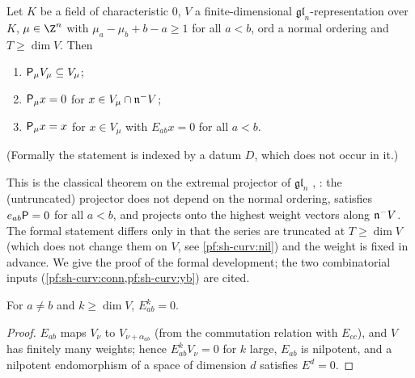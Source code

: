 \begin{theorem}\label{pf:sh-curv:E}
Let $K$ be a field of characteristic $0$, $V$ a finite-dimensional $\mathfrak{gl}_n$-representation over $K$, $\mu\in\Z^n$
with $\mu_a-\mu_b+b-a\ge1$ for all $a<b$, $\mathrm{ord}$ a normal ordering and $T\ge\dim V$. Then
\begin{enumerate}[label=(\roman*)]
\item $\mathsf P_\mu V_\mu\subseteq V_\mu$;
\item $\mathsf P_\mu x=0$ for $x\in V_\mu\cap\mathfrak n^- V$;
\item $\mathsf P_\mu x=x$ for $x\in V_\mu$ with $E_{ab}x=0$ for all $a<b$.
\end{enumerate}
(Formally the statement is indexed by a datum $D$, which does not occur in it.)
\end{theorem}

This is the classical theorem on the extremal projector of $\mathfrak{gl}_n$
\cite{AsherovaSmirnovTolstoy1971}, \cite[Thms.~2 and 4]{Zhelobenko1989}: the (untruncated) projector does not depend on the
normal ordering, satisfies $e_{ab}\mathsf P=0$ for all $a<b$, and projects onto the highest weight vectors along
$\mathfrak n^- V$. The formal statement differs only in that the series are truncated at $T\ge\dim V$ (which does not change
them on $V$, see \cref{pf:sh-curv:nil}) and the weight is fixed in advance. We give the proof of the formal development; the
two combinatorial inputs (\cref{pf:sh-curv:conn,pf:sh-curv:yb}) are cited.

\begin{lemma}[Nilpotency]\label{pf:sh-curv:nil}
For $a\ne b$ and $k\ge\dim V$, $E_{ab}^k=0$.
\end{lemma}

\begin{proof}
$E_{ab}$ maps $V_\nu$ to $V_{\nu+\alpha_{ab}}$ (from the commutation relation with $E_{cc}$), and $V$ has finitely many
weights; hence $E_{ab}^kV_\nu=0$ for $k$ large, $E_{ab}$ is nilpotent, and a nilpotent endomorphism of a space of dimension
$d$ satisfies $E^d=0$.
\end{proof}

